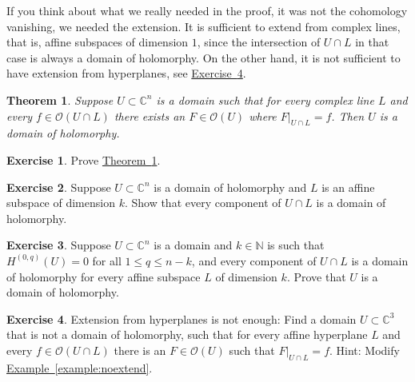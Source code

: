 \documentclass[12pt,openany]{book}
\newcommand{\C}{{\mathbb{C}}}
\newcommand{\N}{{\mathbb{N}}}
\newcommand{\sO}{{\mathscr{O}}}
\theoremstyle{plain}
\newtheorem{thm}{Theorem}[section]
\theoremstyle{remark}
\theoremstyle{definition}
\newenvironment{exbox}{%
    \def\FrameCommand{\vrule width 1pt \relax\hspace{10pt}}%
    \MakeFramed{\advance\hsize-\width\FrameRestore}%
}{%
    \endMakeFramed
}
\theoremstyle{exercise}
\newtheorem{exercise}{Exercise}[section]
\theoremstyle{example}
\newcommand{\exerciseref}[1]{\hyperref[#1]{Exercise~\ref*{#1}}}
\newcommand{\exampleref}[1]{\hyperref[#1]{Example~\ref*{#1}}}
\newcommand{\thmref}[1]{\hyperref[#1]{Theorem~\ref*{#1}}}
\begin{document}
If you think about what we really needed in the proof, it was not the cohomology
vanishing, we needed the extension.  It is sufficient to extend from
complex lines, that is, affine subspaces of dimension $1$, since
the intersection of $U \cap L$ in that case is always a domain of
holomorphy.  On the other hand, it is not sufficient to have extension
from hyperplanes, see \exerciseref{exercise:extensionfromhypnotenough}.

\begin{thm} \label{thm:extensionfromlinesmeansDOH}
Suppose $U \subset \C^n$ is a domain such that for every
complex line $L$ and every $f \in \sO(U \cap L)$ there
exists an $F \in \sO(U)$ where $F|_{U \cap L} = f$.
Then $U$ is a domain of holomorphy.
\end{thm}

\begin{exbox}
\begin{exercise}
Prove \thmref{thm:extensionfromlinesmeansDOH}.
\end{exercise}

\begin{exercise}
Suppose $U \subset \C^n$ is a domain of holomorphy
and $L$ is an affine subspace of dimension $k$.
Show that
every component of $U \cap L$ is a domain of holomorphy.
\end{exercise}

\begin{exercise}
Suppose $U \subset \C^n$ is a domain and $k \in \N$
is such that
$H^{(0,q)}(U)=0$ for all $1 \leq q \leq n-k$,
and
every component of
$U \cap L$ is a domain of holomorphy for
every affine subspace $L$ of dimension $k$.
Prove that $U$ is a domain of holomorphy.
\end{exercise}

\begin{exercise} \label{exercise:extensionfromhypnotenough}
Extension from hyperplanes is not enough:
Find a domain $U \subset \C^3$ that is not a domain of holomorphy,
such that for every affine hyperplane $L$
and every $f \in \sO(U \cap L)$ there is an $F \in \sO(U)$
such that $F|_{U \cap L} = f$.
Hint: Modify \exampleref{example:noextend}.
\end{exercise}
\end{exbox}
\end{document}
